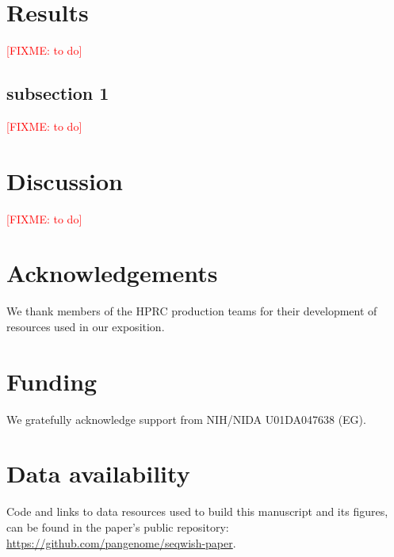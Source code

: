 \documentclass{bioinfo}
\newcommand{\red}[1]{{\textcolor{Red}{#1}}}
\newcommand{\FIXME}[1]{\red{[FIXME: #1]}}
\begin{document}
    \section{Results}
    \label{sec:results}
    \FIXME{to do}

    \subsection{subsection 1}
    \label{subsec:subsec1}
    \FIXME{to do}

    \section{Discussion}
    \label{sec:discussion}
    \FIXME{to do}

    \section*{Acknowledgements}

    We thank members of the HPRC production teams for their development of resources used in our exposition.

    \section*{Funding}

    We gratefully acknowledge support from NIH/NIDA U01DA047638 (EG).

    \section*{Data availability}

    Code and links to data resources used to build this manuscript and its figures, can be found in the paper's public repository: \url{https://github.com/pangenome/seqwish-paper}.

    

    
\end{document}
